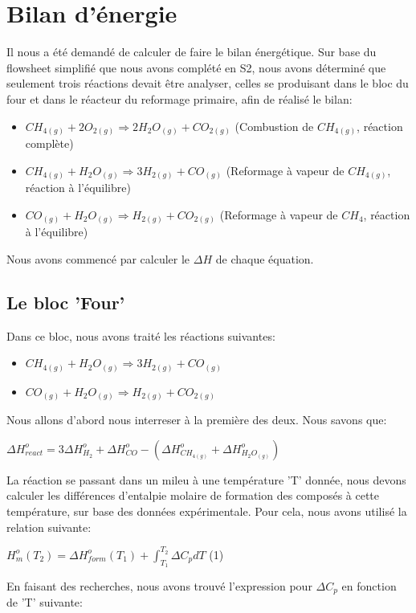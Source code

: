 \documentclass[11pt,a4paper]{report}
\author{Groupe 1246}
\begin{document}
\section*{Bilan d'énergie}
Il nous a été demandé de calculer de faire le bilan énergétique. Sur base du flowsheet simplifié que nous avons complété en S2, nous avons déterminé que seulement trois réactions devait être analyser, celles se produisant dans le bloc du four et dans le réacteur du reformage primaire, afin de réalisé le bilan:
\begin{itemize}
\item{$CH_{4(g)} + 2O_{2(g)} \Rightarrow 2H_{2}O_{(g)} + CO_{2(g)}$ (Combustion de $CH_{4(g)}$, réaction complète)}
\item{$CH_{4(g)} + H_{2}O_{(g)} \Rightarrow 3H_{2(g)} + CO_{(g)}$ (Reformage à vapeur de $CH_{4(g)}$, réaction à l'équilibre)}
\item{$CO_{(g)} + H_{2}O_{(g)} \Rightarrow H_{2(g)} + CO_{2(g)}$ (Reformage à vapeur de $CH_{4}$, réaction à l'équilibre)}
\end{itemize}

Nous avons commencé par calculer le $\Delta H$ de chaque équation.
\subsection*{Le bloc 'Four'}
Dans ce bloc, nous avons traité les réactions suivantes:
\begin{itemize}
\item{$CH_{4(g)} + H_{2}O_{(g)} \Rightarrow 3H_{2(g)} + CO_{(g)}$}
\item{$CO_{(g)} + H_{2}O_{(g)} \Rightarrow H_{2(g)} + CO_{2(g)}$}
\end{itemize}

Nous allons d'abord nous interreser à la première des deux.
Nous savons que:

$\Delta H^o_{react}=3\Delta H^o_{H_2} + \Delta H^o_{CO} - (\Delta H^o_{CH_{4(g)}} + \Delta H^o_{H_{2}O_{(g)}})$

La réaction se passant dans un mileu à une température 'T' donnée, nous devons calculer les différences d'entalpie molaire de formation des composés à cette température, sur base des données expérimentale. Pour cela, nous avons utilisé la relation suivante:

$H^o_m(T_2)=\Delta H^o_{form}(T_1)+\int_{T_1}^{T_2} \Delta C_pdT$   (1)

En faisant des recherches, nous avons trouvé l'expression pour $\Delta C_p$ en fonction de 'T' suivante:
\end{document}

